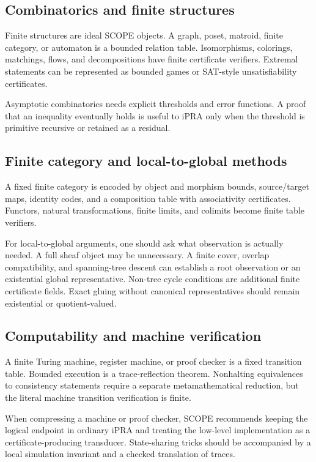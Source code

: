\subsection{Combinatorics and finite structures}

Finite structures are ideal SCOPE objects.  A graph, poset, matroid, finite category, or automaton is a bounded relation table.  Isomorphisms, colorings, matchings, flows, and decompositions have finite certificate verifiers.  Extremal statements can be represented as bounded games or SAT-style unsatisfiability certificates.

Asymptotic combinatorics needs explicit thresholds and error functions.  A proof that an inequality eventually holds is useful to iPRA only when the threshold is primitive recursive or retained as a residual.

\subsection{Finite category and local-to-global methods}

A fixed finite category is encoded by object and morphism bounds, source/target maps, identity codes, and a composition table with associativity certificates.  Functors, natural transformations, finite limits, and colimits become finite table verifiers.

For local-to-global arguments, one should ask what observation is actually needed.  A full sheaf object may be unnecessary.  A finite cover, overlap compatibility, and spanning-tree descent can establish a root observation or an existential global representative.  Non-tree cycle conditions are additional finite certificate fields.  Exact gluing without canonical representatives should remain existential or quotient-valued.

\subsection{Computability and machine verification}

A finite Turing machine, register machine, or proof checker is a fixed transition table.  Bounded execution is a trace-reflection theorem.  Nonhalting equivalences to consistency statements require a separate metamathematical reduction, but the literal machine transition verification is finite.

When compressing a machine or proof checker, SCOPE recommends keeping the logical endpoint in ordinary iPRA and treating the low-level implementation as a certificate-producing transducer.  State-sharing tricks should be accompanied by a local simulation invariant and a checked translation of traces.

